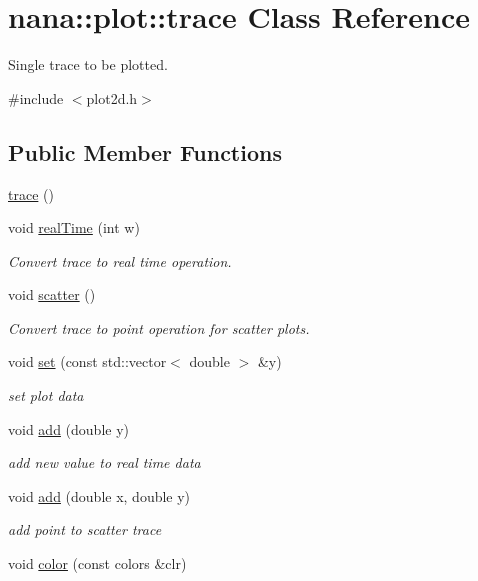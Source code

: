 \hypertarget{classnana_1_1plot_1_1trace}{\section{nana\-:\-:plot\-:\-:trace Class Reference}
\label{classnana_1_1plot_1_1trace}
}


Single trace to be plotted.  




{\ttfamily \#include $<$plot2d.\-h$>$}

\subsection*{Public Member Functions}
\begin{DoxyCompactItemize}
\item 
\hyperlink{classnana_1_1plot_1_1trace_a108e78308cf2542618ded49496e66909}{trace} ()
\item 
void \hyperlink{classnana_1_1plot_1_1trace_a0e8375d6a795924345d354588b300a0d}{real\-Time} (int w)
\begin{DoxyCompactList}\small\item\em Convert trace to real time operation. \end{DoxyCompactList}\item 
\hypertarget{classnana_1_1plot_1_1trace_a26a4daad616b3dfc0b76bd1a3b558930}{void \hyperlink{classnana_1_1plot_1_1trace_a26a4daad616b3dfc0b76bd1a3b558930}{scatter} ()}\label{classnana_1_1plot_1_1trace_a26a4daad616b3dfc0b76bd1a3b558930}

\begin{DoxyCompactList}\small\item\em Convert trace to point operation for scatter plots. \end{DoxyCompactList}\item 
void \hyperlink{classnana_1_1plot_1_1trace_a681d2e5d8d335e7785b30ce9d5548bf5}{set} (const std\-::vector$<$ double $>$ \&y)
\begin{DoxyCompactList}\small\item\em set plot data \end{DoxyCompactList}\item 
void \hyperlink{classnana_1_1plot_1_1trace_a183d7b46d2af84c0baec752ecfe668dc}{add} (double y)
\begin{DoxyCompactList}\small\item\em add new value to real time data \end{DoxyCompactList}\item 
void \hyperlink{classnana_1_1plot_1_1trace_a7832bca87472ab44fd382f3eaa6cb17d}{add} (double x, double y)
\begin{DoxyCompactList}\small\item\em add point to scatter trace \end{DoxyCompactList}\item 
\hypertarget{classnana_1_1plot_1_1trace_a093e666f7ab2f6a044b9d02edb6f7c75}{void \hyperlink{classnana_1_1plot_1_1trace_a093e666f7ab2f6a044b9d02edb6f7c75}{color} (const colors \&clr)}\label{classnana_1_1plot_1_1trace_a093e666f7ab2f6a044b9d02edb6f7c75}


\end{DoxyCompactItemize}
